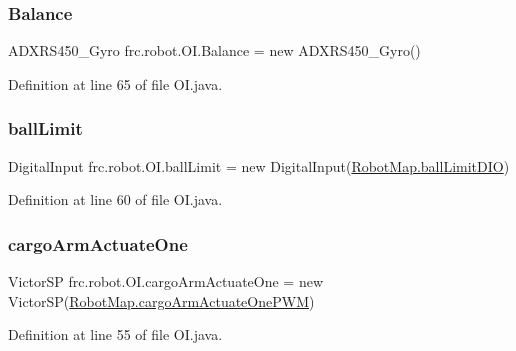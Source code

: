 \subsubsection{\texorpdfstring{Balance}{Balance}}
{\footnotesize\ttfamily A\+D\+X\+R\+S450\+\_\+\+Gyro frc.\+robot.\+O\+I.\+Balance = new A\+D\+X\+R\+S450\+\_\+\+Gyro()\hspace{0.3cm}{\ttfamily [static]}}



Definition at line 65 of file O\+I.\+java.

\mbox{\label{classfrc_1_1robot_1_1_o_i_aebf7c01734a48f269b40f7b1f1125f10}} 
\subsubsection{\texorpdfstring{ball\+Limit}{ballLimit}}
{\footnotesize\ttfamily Digital\+Input frc.\+robot.\+O\+I.\+ball\+Limit = new Digital\+Input(\hyperlink{classfrc_1_1robot_1_1_robot_map_a83f3eec03443af1dbe44492871796c92}{Robot\+Map.\+ball\+Limit\+D\+IO})\hspace{0.3cm}{\ttfamily [static]}}



Definition at line 60 of file O\+I.\+java.

\mbox{\label{classfrc_1_1robot_1_1_o_i_aeee9fe6efef4ea8f2558ccd2de43e71a}} 
\subsubsection{\texorpdfstring{cargo\+Arm\+Actuate\+One}{cargoArmActuateOne}}
{\footnotesize\ttfamily Victor\+SP frc.\+robot.\+O\+I.\+cargo\+Arm\+Actuate\+One = new Victor\+SP(\hyperlink{classfrc_1_1robot_1_1_robot_map_aaff9d0adef8e1f97db2ac47f985f044a}{Robot\+Map.\+cargo\+Arm\+Actuate\+One\+P\+WM})\hspace{0.3cm}{\ttfamily [static]}}



Definition at line 55 of file O\+I.\+java.

\mbox{\label{classfrc_1_1robot_1_1_o_i_a7ec725773fd1bb5dc4263980a232e75f}} 
